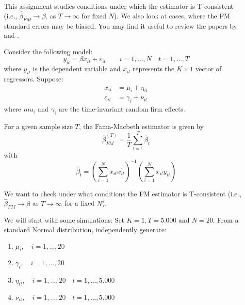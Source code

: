 This assignment studies conditions under which the \citeauthor{fama1973risk} estimator is T-consistent (i.e., \(\widehat\beta_{FM} \to \beta\), as \(T \to \infty\) for fixed \(N\)). We also look at cases, where the FM standard errors may be biased. You may find it useful to review the papers by \citet{petersen2008estimating} and \citet{skoulakis2008panel}.

Consider the following model:
\begin{equation}
\label{eq:y_dgp}
y_{it} = \beta x_{it} + \varepsilon_{it} \qquad i = 1, \dots, N \quad t = 1, \dots, T
\end{equation}
where \(y_{it}\) is the dependent variable and \(x_{it}\) represents the \(K\times 1\) vector of regressors. Suppose:
\begin{equation}
\label{eq:x_dgp}
\begin{aligned}
    x_{it} & = \mu_i + \eta_{it} \\
    \varepsilon_{it} & = \gamma_i + \nu_{it}
\end{aligned}
\end{equation}
where \(mu_i\) and \(\gamma_i\) are the time-invariant random firm effects.

For a given sample size \(T\), the Fama-Macbeth estimator is given by
\begin{equation}
\label{eq:fm_estimator}
\widehat\beta^{(T)}_{FM} = \frac{1}{T} \sum_{t=1}^T  \widehat\beta_t
\end{equation}
with
\begin{equation}
\label{eq:beta_t}
\widehat\beta_t = \left(\sum_{i=1}^N x_{it}x_{it}^\prime\right)^{-1} \left(\sum_{i=1}^N x_{it}y_{it}\right)
\end{equation}

We want to check under what conditions the FM estimator is T-consistent (i.e., \(\widehat\beta_{FM} \to \beta\) as \(T\to\infty\) for a fixed \(N\)).

We will start with some simulations: Set \(K = 1, T = 5.000\) and \(N =20\). From a standard Normal distribution, independently generate:
\begin{enumerate}[label = \arabic*.]
\item \(\mu_i, \quad i = 1, \dots, 20\)
\item \(\gamma_i, \quad i = 1, \dots, 20\)
\item \(\eta_{it}, \quad i = 1, \dots, 20 \quad t = 1, \dots, 5.000\)
\item \(\nu_{it}, \quad i = 1, \dots, 20 \quad t = 1, \dots, 5.000\)
\end{enumerate}

